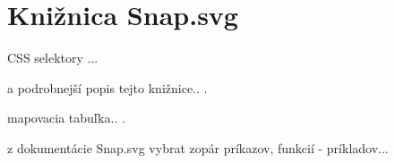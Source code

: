 \chapter{Knižnica Snap.svg}

CSS selektory ... 

a podrobnejší popis tejto knižnice.. .

mapovacia tabuľka.. .

z dokumentácie Snap.svg vybrat zopár príkazov, funkcií - príkladov...

